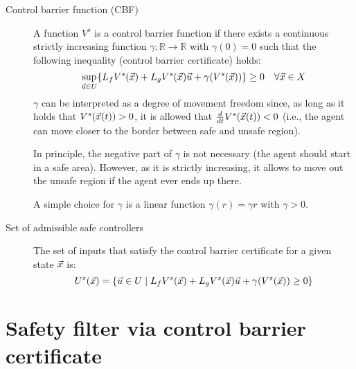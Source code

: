 \begin{description}
    \item[Control barrier function (CBF)] 
        A function $V^s$ is a control barrier function if there exists a continuous strictly increasing function $\gamma: \mathbb{R} \rightarrow \mathbb{R}$ with $\gamma(0) = 0$ such that the following inequality (control barrier certificate) holds:
        \[
            \sup_{{\vec{u}} \in U} \{ L_fV^s({\vec{x}}) + L_gV^s({\vec{x}}){\vec{u}} + \gamma(V^s({\vec{x}})) \} \geq 0 \quad \forall {\vec{x}} \in X
        \]
        $\gamma$ can be interpreted as a degree of movement freedom since, as long as it holds that $V^s({\vec{x}}(t)) > 0$, it is allowed that $\frac{d}{dt} V^s({\vec{x}}(t)) < 0$ (i.e., the agent can move closer to the border between safe and unsafe region).

        \begin{remark}
            In principle, the negative part of $\gamma$ is not necessary (the agent should start in a safe area). However, as it is strictly increasing, it allows to move out the unsafe region if the agent ever ends up there.
        \end{remark}

        \begin{example}
            A simple choice for $\gamma$ is a linear function $\gamma(r) = \gamma r$ with $\gamma > 0$.
        \end{example}

    \item[Set of admissible safe controllers] 
        The set of inputs that satisfy the control barrier certificate for a given state ${\vec{x}}$ is:
        \[
            U^s({\vec{x}}) = \{ {\vec{u}} \in U \mid L_f V^s({\vec{x}}) + L_g V^s({\vec{x}}) {\vec{u}} + \gamma(V^s({\vec{x}})) \geq 0 \}
        \]
\end{description}


\section{Safety filter via control barrier certificate}

